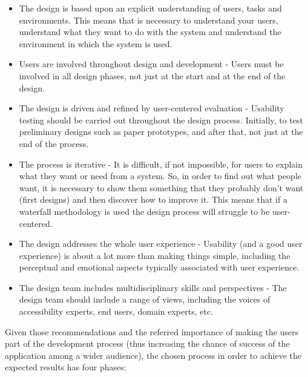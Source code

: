 \begin{itemize}
\item The design is based upon an explicit understanding of users, tasks and environments. This means that is necessary to understand your users, understand what they want to do with the system and understand the environment in which the system is used.

\item Users are involved throughout design and development - Users must be involved in all design phases, not just at the start and at the end of the design.

\item The design is driven and refined by user-centered evaluation - Usability testing should be carried out throughout the design process. Initially, to test preliminary designs such as paper prototypes, and after that, not just at the end of the process.

\item The process is iterative - It is difficult, if not impossible, for users to explain what they want or need from a system. So, in order to find out what people want, it is necessary to show them something that they probably don't want (first designs) and then discover how to improve it. This means that if a waterfall methodology is used the design process will struggle to be user-centered.

\item The design addresses the whole user experience - Usability (and a good user experience) is about a lot more than making things simple, including the perceptual and emotional aspects typically associated with user experience.

\item The design team includes multidisciplinary skills and perspectives - The design team should include a range of views, including the voices of accessibility experts, end users, domain experts, etc.
\end{itemize}



Given those recommendations and the referred importance of making the users part of the development process (thus increasing the chance of success of the application among a wider audience), the chosen process in order to achieve the expected results has four phases: 

